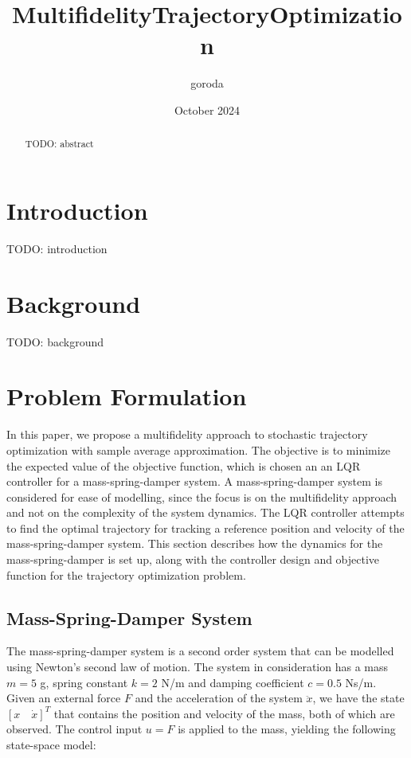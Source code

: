 \documentclass{article}
\title{MultifidelityTrajectoryOptimization}
\author{goroda }
\date{October 2024}
\begin{document}
\maketitle

\begin{abstract}
  TODO: abstract
\end{abstract}

\section{Introduction}
TODO: introduction
\section{Background}
TODO: background

\section{Problem Formulation}
In this paper, we propose a multifidelity approach to stochastic trajectory optimization with sample average approximation.
The objective is to minimize the expected value of the objective function, which is chosen an an LQR controller for a mass-spring-damper system.
A mass-spring-damper system is considered for ease of modelling, since the focus is on the multifidelity approach
and not on the complexity of the system dynamics.
The LQR controller attempts to find the optimal trajectory for tracking a reference position and velocity of the mass-spring-damper system.
This section describes how the dynamics for the mass-spring-damper is set up, along with the controller design and objective function for the trajectory optimization problem.

\subsection{Mass-Spring-Damper System}
The mass-spring-damper system is a second order system that can be modelled using Newton's second law of motion.
The system in consideration has a mass $m=5$ g, spring constant $k=2$ N/m and damping coefficient $c=0.5$ Ns/m.
Given an external force $F$ and the acceleration of the system $\ddot{x}$, we have the state $[x \quad \dot{x}]^T$
that contains the position and velocity of the mass, both of which are observed.
The control input $u=F$ is applied to the mass, yielding the following state-space model:
\end{document}
